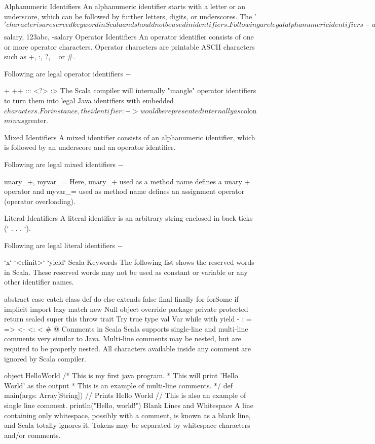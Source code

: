 Alphanumeric Identifiers
An alphanumeric identifier starts with a letter or an underscore, which can be followed by further letters, digits, or underscores. The '$' character is a reserved keyword in Scala and should not be used in identifiers.

Following are legal alphanumeric identifiers −

age, salary, _value,  __1_value
Following are illegal identifiers −

$salary, 123abc, -salary
Operator Identifiers
An operator identifier consists of one or more operator characters. Operator characters are printable ASCII characters such as +, :, ?, ~ or #.

Following are legal operator identifiers −

+ ++ ::: <?> :>
The Scala compiler will internally "mangle" operator identifiers to turn them into legal Java identifiers with embedded $ characters. For instance, the identifier :-> would be represented internally as $colon$minus$greater.

Mixed Identifiers
A mixed identifier consists of an alphanumeric identifier, which is followed by an underscore and an operator identifier.

Following are legal mixed identifiers −

unary_+,  myvar_=
Here, unary_+ used as a method name defines a unary + operator and myvar_= used as method name defines an assignment operator (operator overloading).

Literal Identifiers
A literal identifier is an arbitrary string enclosed in back ticks (` . . . `).

Following are legal literal identifiers −

`x` `<clinit>` `yield`
Scala Keywords
The following list shows the reserved words in Scala. These reserved words may not be used as constant or variable or any other identifier names.

abstract	case	catch	class
def	do	else	extends
false	final	finally	for
forSome	if	implicit	import
lazy	match	new	Null
object	override	package	private
protected	return	sealed	super
this	throw	trait	Try
true	type	val	Var
while	with	yield	 
-	:	=	=>
<-	<:	<%
#	@		
Comments in Scala
Scala supports single-line and multi-line comments very similar to Java. Multi-line comments may be nested, but are required to be properly nested. All characters available inside any comment are ignored by Scala compiler.

object HelloWorld {
   /* This is my first java program.  
    * This will print 'Hello World' as the output
    * This is an example of multi-line comments.
    */
   def main(args: Array[String]) {
      // Prints Hello World
      // This is also an example of single line comment.
      println("Hello, world!") 
   }
}
Blank Lines and Whitespace
A line containing only whitespace, possibly with a comment, is known as a blank line, and Scala totally ignores it. Tokens may be separated by whitespace characters and/or comments.


